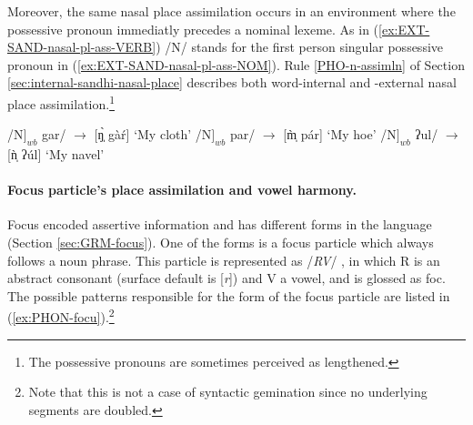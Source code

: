 Moreover,  the same nasal place assimilation occurs in an environment where the
possessive pronoun  immediatly precedes a nominal lexeme. As in 
(\ref{ex:EXT-SAND-nasal-pl-ass-VERB})  /N/  stands for the  first person
singular
possessive pronoun  in
(\ref{ex:EXT-SAND-nasal-pl-ass-NOM}). Rule \ref{PHO-n-assimln} of Section
\ref{sec:internal-sandhi-nasal-place}  describes both word-internal and
 -external nasal place assimilation.\footnote{The possessive pronouns 
are sometimes perceived as lengthened.}

\begin{exe}
\ex\label{ex:EXT-SAND-nasal-pl-ass-NOM} 
\begin{xlist}
 \ex\label{ex:EXT-SAND-N} 
/N$]_{wb}$ gar/ $\rightarrow$ [ŋ̩̀ gàŕ]  {\rm  `My cloth'}
 \ex\label{ex:EXT-SAND-m} 
/N$]_{wb}$ par/ $\rightarrow$ [m̩̀ pár]  {\rm  `My hoe'}
 \ex\label{ex:EXT-SAND-n} 
/N$]_{wb}$ ʔul/ $\rightarrow$ [ǹ̩ ʔúl] {\rm  `My navel'}
\end{xlist}
\end{exe}



\paragraph{Focus particle's place assimilation and vowel harmony.}
\label{sec:focus-forms}

Focus encoded assertive information and has different forms in the language 
(Section \ref{sec:GRM-focus}). One of the forms is a  focus particle which 
always follows a noun phrase. This particle is represented as /{\it RV}/ , in 
which R is an abstract consonant (surface default is [{\it r}]) and V a vowel, 
and  is glossed as {\sc foc}. The possible patterns responsible for the form of 
the focus particle are listed in (\ref{ex:PHON-focu}).\footnote{Note that this 
is not a case of syntactic gemination since no underlying segments are doubled.}

